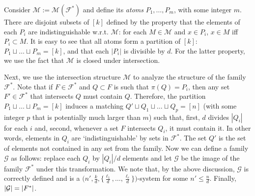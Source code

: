 \documentclass[graybox]{svmult}
\renewcommand{\le}{\leqslant}
\newcommand{\ff}{\mathcal{F}}
\newcommand{\m}{\mathcal}
\begin{document}
Consider $\m M:=\m M(\ff^*)$ and define its {\it atoms} $P_1,\ldots, P_m$, with some integer $m$. There are disjoint subsets of $[k]$ defined by the property that the elements of each $P_i$ are indistinguishable w.r.t. $\m M$: for each $M\in \m M$ and $x\in P_i$, $x\in M$ iff $P_i\subset M$. It is easy to see that all atoms form a partition of $[k]$: $P_1\sqcup\ldots\sqcup P_m = [k]$, and that each $|P_i|$ is divisible by $d$. For the latter property, we use the fact that $\m M$ is closed under intersection.



Next, we use the intersection structure $\m M$ to analyze the structure of the family $\ff^*$. Note that if $F\in \ff^*$ and $Q\subset F$ is such that $\pi(Q) = P_i$, then any set $F'\in \ff^*$ that intersects $Q$ must contain $Q$. Therefore, the partition $P_1\sqcup\ldots\sqcup P_m = [k]$ induces a matching   $Q'\sqcup Q_1\sqcup\ldots \sqcup Q_{p}=[n]$ (with some integer $p$ that is potentially much larger than $m$) such that, first, $d$ divides $|Q_i|$ for each $i$ and, second, whenever a set $F$ intersects $Q_i$, it must contain it. In other words, elements in $Q_i$ are `indistinguishable' by sets in $\ff^*$. The set $Q'$ is the set of elements not contained in any set from the family. Now we can define a family $\m G$ as follows: replace each $Q_i$ by $|Q_i|/d$ elements and let $\m G$ be the image of the family $\ff^*$ under this transformation. We note that, by the above discussion, $\m G$ is correctly defined and is a $\big(n',\frac kd,\{\frac{\ell_1}d,\ldots, \frac{\ell_r}d\}\big)$-system for some $n'\le \frac nd$. Finally,  $|\m G| = |\m \ff^*|$.
\end{document}
